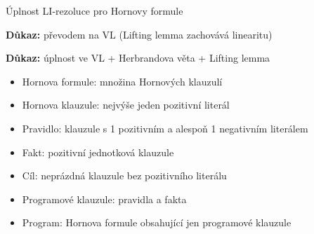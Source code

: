 \documentclass{beamer}
\begin{document}
\begin{frame}{Úplnost LI-rezoluce pro Hornovy formule}

    \medskip


    \textbf{Důkaz:} převodem na VL (Lifting lemma zachovává linearitu) \hfill\qedsymbol

    \bigskip

        
    \textbf{Důkaz:} úplnost ve VL + Herbrandova věta + Lifting lemma\hfill\qedsymbol

    \smallskip
    
    \begin{itemize}\small
        \item \alert{Hornova formule:} množina Hornových klauzulí
        \item \alert{Hornova klauzule:} nejvýše jeden pozitivní literál   
        \item \alert{Pravidlo:} klauzule s 1 pozitivním a alespoň 1 negativním literálem  
         
        \item \alert{Fakt:} pozitivní jednotková klauzule    
        \item \alert{Cíl:} neprázdná klauzule bez pozitivního literálu 
        \item \alert{Programové klauzule:} pravidla a fakta  
        \item \alert{Program}: Hornova formule obsahující jen programové klauzule
    \end{itemize}

\end{frame}
\end{document}
